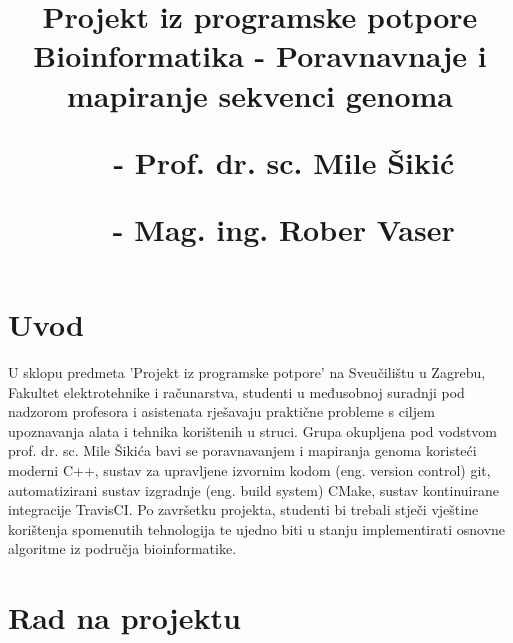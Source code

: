 \documentclass[times, 12pt, utf8]{article}
\begin{document}
	
	\begin{titlepage}
		\clearpage
		\thispagestyle{empty}
		
		\title{
			{\large Projekt iz programske potpore} \\
			{ \textbf{Bioinformatika - Poravnavnaje i mapiranje sekvenci genoma} }
			
			\vbox{}
			\vspace{0.5cm}
			
			\footnotesize{
				\begin{itemize}[leftmargin=3.5cm]
					\setlength{\itemindent}{0.8cm}
					
					Voditelji: 
					\item[-] Prof. dr. sc. Mile Šikić
					\item[-] Mag. ing. Rober Vaser
				\end{itemize}
				
			}
			
			\date{}
		}
		
		\clearpage
	\end{titlepage}
	
	\maketitle
	
	\newpage
	\clearpage
	
	\tableofcontents
	
	\newpage
	\clearpage
	
	\section{Uvod}
	U sklopu predmeta 'Projekt iz programske potpore' na Sveučilištu u Zagrebu,
	Fakultet elektrotehnike i računarstva, studenti u međusobnoj suradnji 
	pod nadzorom profesora i asistenata rješavaju praktične probleme
	s ciljem upoznavanja alata i tehnika korištenih u struci. Grupa 
	okupljena pod vodstvom prof. dr. sc. Mile Šikića bavi se 
	poravnavanjem i mapiranja genoma koristeći moderni C++,
	sustav za upravljene izvornim kodom (eng. version control) git,
	automatizirani sustav izgradnje (eng. build system) CMake,
	sustav kontinuirane integracije TravisCI.
	Po završetku projekta, studenti bi trebali stječi vještine 
	korištenja spomenutih tehnologija te ujedno biti u stanju 
	implementirati osnovne algoritme iz područja bioinformatike.
	
	\section{Rad na projektu}
	
\end{document}
